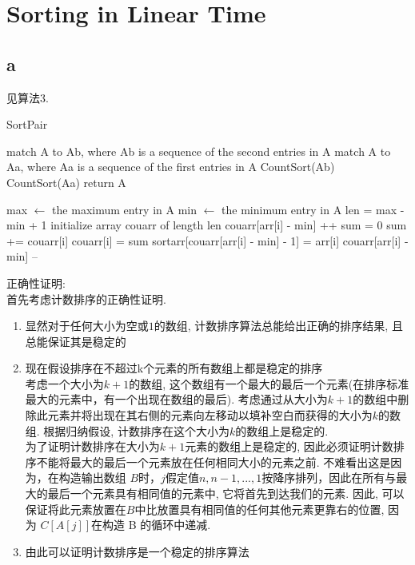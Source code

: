 \documentclass{article}
\begin{document}
\section{Sorting in Linear Time}
\subsection{a}
见算法3. 

\begin{algorithm}
\caption{SortPair}
\begin{algorithmic}[1]
\State match A to Ab, where Ab is a sequence of the second entries in A 
\State match A to Aa, where Aa is a sequence of the first entries in A 
\State CountSort(Ab)
\State CountSort(Aa)
\State return A
\State
\EndProcedure

\State max $\gets$ the maximum entry in A
\State min $\gets$ the minimum entry in A
\State len = max - min + 1
\State initialize array couarr of length len
\State couarr[arr[i] - min] ++ 
\State sum = 0
\EndFor
{}
\State sum += couarr[i]
\State couarr[i] = sum
\EndFor
{}
\State sortarr[couarr[arr[i] - min] - 1] = arr[i]
\State couarr[arr[i] - min] -- 
\EndFor
\EndProcedure
\end{algorithmic}
\end{algorithm}
正确性证明: \\
首先考虑计数排序的正确性证明. \\
\begin{enumerate}[1)]
\item 显然对于任何大小为空或$1$的数组, 计数排序算法总能给出正确的排序结果, 且总能保证其是稳定的 
\item 现在假设排序在不超过k个元素的所有数组上都是稳定的排序 \\
考虑一个大小为$k+1$的数组, 这个数组有一个最大的最后一个元素(在排序标准最大的元素中，有一个出现在数组的最后). 考虑通过从大小为$k+1$的数组中删除此元素并将出现在其右侧的元素向左移动以填补空白而获得的大小为$k$的数组. 根据归纳假设, 计数排序在这个大小为$k$的数组上是稳定的. \\
为了证明计数排序在大小为$k+1$元素的数组上是稳定的, 因此必须证明计数排序不能将最大的最后一个元素放在任何相同大小的元素之前. 不难看出这是因为，在构造输出数组 $B$时，$j$假定值$n, n-1, ..., 1$按降序排列，因此在所有与最大的最后一个元素具有相同值的元素中, 它将首先到达我们的元素. 因此, 可以保证将此元素放置在$B$中比放置具有相同值的任何其他元素更靠右的位置, 因为 $C[A[j]]$在构造 B 的循环中递减. 
\item 由此可以证明计数排序是一个稳定的排序算法
\end{enumerate}
\end{document}
